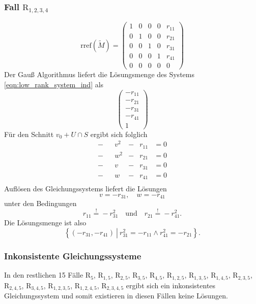 \documentclass[a4paper,oneside, 11pt, openany%
]{article}
\theoremstyle{custom}
\theoremstyle{custom}
\begin{document}
\subsubsection*{Fall $\text{R}_{1,2,3,4}$}
\begin{equation*}\label{eqn:rref_rank4}
	\text{rref}(\tilde{M}) =
	\left( \begin{array}{ccccc}
		1&0&0&0&r_{11}\\
		0&1&0&0&r_{21}\\
		0&0&1&0&r_{31}\\
		0&0&0&1&r_{41}\\
		0&0&0&0&0
	\end{array}\right)
\end{equation*}
Der Gauß Algorithmus liefert die Lösungsmenge des Systems \eqref{eqn:low_rank_system_ind} als
\begin{equation*}
	\begin{pmatrix}
		-r_{11}\\
		-r_{21}\\
		-r_{31}\\
		-r_{41}\\
		1
	\end{pmatrix}
\end{equation*}
Für den Schnitt $v_0 + U \cap S $ ergibt sich folglich
\begin{equation*}
	\begin{alignedat}{5}
		-&&v^2&-&r_{11}&=0\\
		-&&w^2&-&r_{21}&=0\\
		-&&v&-&r_{31}&=0\\
		-&&w&-&r_{41}&=0\\
	\end{alignedat}
\end{equation*}
Auflösen des Gleichungssystems liefert die Lösungen
\begin{equation*}
	v = -r_{31}, \quad w = -r_{41}
\end{equation*}
unter den Bedingungen
\begin{equation*}
	r_{11} \overset{!}{=} -r_{31}^2 \quad \text{und} \quad r_{21} \overset{!}{=} -r_{41}^2.
\end{equation*}
Die Lösungsmenge ist also
\begin{equation*}
	\left\lbrace (-r_{31},-r_{41}) \ \left| \ r_{31}^2=-r_{11} \wedge  r_{41}^2=-r_{21}\right.\right\rbrace .
\end{equation*} 
\subsubsection*{Inkonsistente Gleichungssysteme}
In den restlichen 15 Fälle $\text{R}_{5}$, $\text{R}_{1,5}$, $\text{R}_{2,5}$, $\text{R}_{3,5}$, $\text{R}_{4,5}$, $\text{R}_{1,2,5}$, $\text{R}_{1,3,5}$, $\text{R}_{1,4,5}$, $\text{R}_{2,3,5}$, $\text{R}_{2,4,5}$, $\text{R}_{3,4,5}$, $\text{R}_{1,2,3,5}$, $\text{R}_{1,2,4,5}$, $\text{R}_{2,3,4,5}$ ergibt sich ein inkonsistentes Gleichungssystem und somit existieren in diesen Fällen keine Lösungen.
\end{document}

